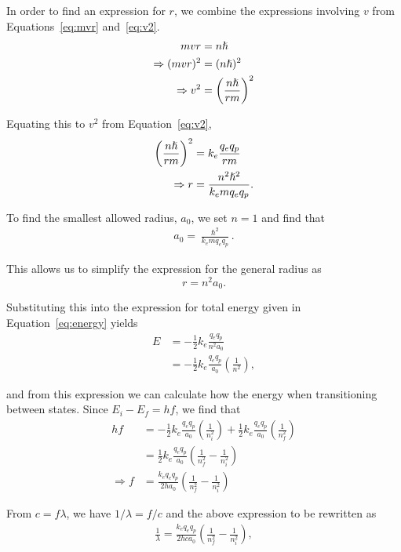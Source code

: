 \documentclass[twocolumn,english]{IEEEtran}
\theoremstyle{plain}
\theoremstyle{plain}
\begin{document}
In order to find an expression for $r$, we combine the expressions involving $v$ from Equations~\ref{eq:mvr} and~\ref{eq:v2}.
\begin{align}
	mvr &= n\hslash \notag \\
	\Rightarrow (mvr)^2 &= (n\hslash)^2 \notag \\
	\Rightarrow v^2 &= \left(\frac{n\hslash}{rm}\right)^2
\end{align}

Equating this to $v^2$ from Equation~\ref{eq:v2},
\begin{align}
	\left(\frac{n\hslash}{rm}\right)^2 &= k_e\frac{q_e q_p}{rm} \notag \\
	\Rightarrow r&= \frac{n^2\hslash^2}{k_e mq_e q_p}.
\end{align}

To find the smallest allowed radius, $a_0$, we set $n=1$ and find that
\begin{align}
	a_0 = \frac{\hslash^2}{k_e mq_e q_p}.
\end{align}

This allows us to simplify the expression for the general radius as
\begin{equation}
	r = n^2 a_0.
\end{equation}

Substituting this into the expression for total energy given in Equation~\ref{eq:energy} yields
\begin{align}
	E &= -\frac{1}{2} k_e\frac{q_e q_p}{n^2 a_0} \\
	 &= -\frac{1}{2} k_e\frac{q_e q_p}{ a_0}\left( \frac{1}{n^2}\right),
\end{align}

and from this expression we can calculate how the energy when transitioning between states. Since $E_i - E_f = hf$, we find that
\begin{align*}
	hf &= -\frac{1}{2} k_e\frac{q_e q_p}{ a_0}\left( \frac{1}{n_i^2}\right)
	+ \frac{1}{2} k_e\frac{q_e q_p}{ a_0}\left( \frac{1}{n_f^2}\right) \\
	&= \frac{1}{2} k_e\frac{q_e q_p}{a_0} \left( \frac{1}{n_f^2} - \frac{1}{n_i^2}\right) \\
	\Rightarrow f &= \frac{k_e q_e q_p}{2ha_0} \left( \frac{1}{n_f^2} - \frac{1}{n_i^2}\right)
\end{align*}

From $c=f\lambda$, we have $1/\lambda = f/c$ and the above expression to be rewritten as
\begin{align*}
 \frac{1}{\lambda} = \frac{k_e q_e q_p}{2hca_0} \left( \frac{1}{n_f^2} - \frac{1}{n_i^2}\right),
\end{align*}
\end{document}
